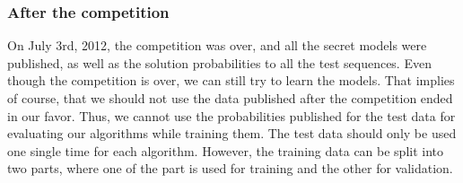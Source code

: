 \subsubsection{After the competition}
On July 3rd, 2012, the competition was over, and all the secret models were published, as well as the solution probabilities to all the test sequences.
Even though the competition is over, we can still try to learn the models.
That implies of course, that we should not use the data published after the competition ended in our favor.
Thus, we cannot use the probabilities published for the test data for evaluating our algorithms while training them.
The test data should only be used one single time for each algorithm.
However, the training data can be split into two parts, where one of the part is used for training and the other for validation.